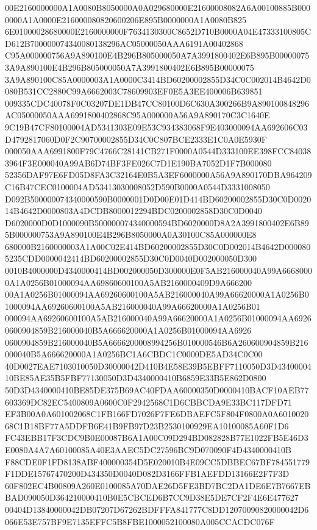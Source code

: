 \documentclass[UTF8,fontset=fandol,zihao=-4,a4paper]{ctexart}
\begin{document}
{{00E2160000000A1A0080B8050000A0A029680000E21600008082A6A00100885B0000000A1A0000E216000080820600206E895B0000000A1A0080B825
6E01000028680000E2160000000F7634130300C8652D710B0000A04E47333100805CD612B700000074340080138296AC05000050AAA6191A00402868
C95A000000756A9A890100E4B296B805000050A7A3991800402E6B895B000000753A9A890100E4B296B805000050A7A3991800402E6B895B00000075
3A9A890100C85A0000003A1A0000C3414BD60200002855D34C0C002014B4642D0080B531CC2880C99A6662003C78609903EF0E5A3EE400006B639851
009335CDC40078F0C03207DE1DB47CC80100D6C630A300266B9A890100848296AC05000050AAA6991800402868C95A000000A56A9A890170C3C1640E
9C19B47CF80100004AD5341303E09E53C934383068F9E403000094AA692606C03D4792817060D0F2C90700002855D34C0C807BCE2333E1C0A0E5930F
000050AAA6991800F79C4766C28141CB271F0000A0544D333100EE398FCC840383964F3E000040A99AB6D74BF3FE026C7D1E190BA7052D1F7B000080
52356DAF97E6FD05D8FA3C32164E0B5A3EF6000000A56A9A890170DBA964209C16B47CEC0100004AD53413030008052D590B0000A0544D3331008050
D092B500000074340000590B0000001D0D00E01D414BD60200002855D30C0D002014B4642D0000803A4DCDB8000012294BDC0200002858D30C0D0040
D6020000D0D1000090B500000074340000594BD6020000D8A2A3991800402E6B895B000000753A9A890100E4B296B8050000A0A30100C85A000000E8
680000B2160000003A1A00C02E414BD60200002855D30C0D002014B4642D0000805235CDD0000042414BD60200002855D30C0D0040D002000050D300
0010B4000000D4340000414BD002000050D300000E0F5AB216000040A99A66680000A1A0256B01000094AA69860600100A5AB2160000409D9A666200
00A1A0256B01000094AA69260600100A5AB216000040A99A66620000A1A0256B01000094AA69260600100A5AB216000040A99A66620000A1A0256B01
000094AA69260600100A5AB216000040A99A66620000A1A0256B01000094AA69260600904859B216000040B5A666620000A1A0256B01000094AA6926
0600904859B216000040B5A6666200008994256B010000546B6A260600904859B216000040B5A666620000A1A0256BC1A6CBDC1C0000DE5AD34C0C00
40D0027EAE7103010050D30000042D410B4E58E39B5EBFF7110050D3D4340000410BE85AE35B5FBF77130050D3D4340000410B6859E33B5E862D0800
50D3D4340000410BE85DE375B69AC40FDAA60000350D0000410BACF10AEB77603369DC82EC5400809A0600C0F2942568C1D6CBBCDA9E33BC117DFD71
EF3B00A0A601002068C1FB166FD7026F7FE6DBAEFC5F804F0800A0A601002068C1B18BF77A5DDFB6E41B9FB97D23B2530100929EA10100085A60F1D6
FC43EBB17F3CDC9B0E00087B6A1A00C09D294BD082828B77E1022FB5E46D3E0080A4A7A60100085A40E3AAEC5DC27596BC9D070090F4D4340000410B
F88CDE0F1FD8138ABF400000354D5E020010B4E09CC5DBBEC67BF784551779F1DDE15767470200D434350D0040D082D3166FFB1AEFDD13166E2F7F3D
60F802EC4B00809A260E0100085A70DAE26D5FE3BD7BC2DA1DE6E7B7667EBBAD090050D364210000410B0E5CBCED6B7CC9D38E5DE7CF2F4E6E477627
00404D13840000042DB07207D67262BDFFFA841777C8DD12070090820000042D6066E53E757BF9E7135EFFC5B8FBE1000052100080A005CCACDC076F
}}
\end{document}
